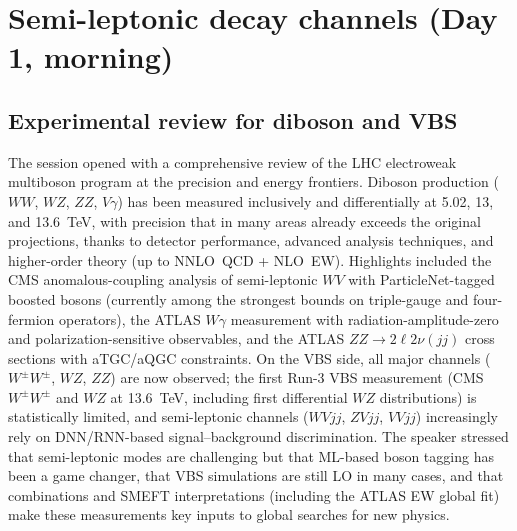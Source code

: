 \section{Semi-leptonic decay channels (Day 1, morning)}

\subsection{Experimental review for diboson and VBS}
The session opened with a comprehensive review of the LHC electroweak
multiboson program at the precision and energy frontiers. Diboson production
($WW$, $WZ$, $ZZ$, $V\gamma$) has been measured inclusively and differentially
at 5.02, 13, and 13.6~TeV, with precision that in many areas already exceeds
the original projections, thanks to detector performance, advanced analysis
techniques, and higher-order theory (up to NNLO~QCD + NLO~EW). Highlights
included the CMS anomalous-coupling analysis of semi-leptonic $WV$ with
ParticleNet-tagged boosted bosons (currently among the strongest bounds on
triple-gauge and four-fermion operators), the ATLAS $W\gamma$ measurement with
radiation-amplitude-zero and polarization-sensitive observables, and the ATLAS
$ZZ\to 2\ell 2\nu(jj)$ cross sections with aTGC/aQGC constraints. On the VBS
side, all major channels ($W^{\pm}W^{\pm}$, $WZ$, $ZZ$) are now observed; the
first Run-3 VBS measurement (CMS $W^{\pm}W^{\pm}$ and $WZ$ at 13.6~TeV,
including first differential $WZ$ distributions) is statistically limited, and
semi-leptonic channels ($WVjj$, $ZVjj$, $VVjj$) increasingly rely on
DNN/RNN-based signal--background discrimination. The speaker stressed that
semi-leptonic modes are challenging but that ML-based boson tagging has been a
game changer, that VBS simulations are still LO in many cases, and that
combinations and SMEFT interpretations (including the ATLAS EW global fit) make
these measurements key inputs to global searches for new physics.

